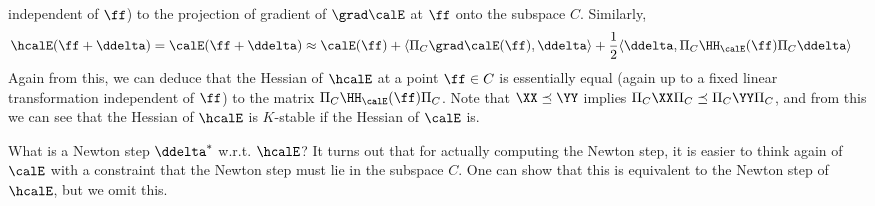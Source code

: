 independent of $\ff$) to the projection of gradient of $\grad\calE$ at $\ff$ onto the subspace $C$.
Similarly,
\begin{align*}
   \hcalE(\ff+\ddelta) = \calE(\ff+\ddelta) & \approx \calE(\ff) + \langle\Pi_C\grad\calE(\ff),\ddelta\rangle + \frac{1}{2}\langle\ddelta,\Pi_C\HH_{\calE}(\ff)\Pi_C\ddelta\rangle
\end{align*}
Again from this, we can deduce that the Hessian of $\hcalE$ at a point
$\ff\in C$ is essentially equal (again up to a fixed linear transformation
independent of $\ff$) to the
matrix $\Pi_C\HH_{\calE}(\ff)\Pi_C$.
Note that $\XX \preceq \YY$ implies  $\Pi_C \XX \Pi_C \preceq \Pi_C
\YY \Pi_C$, and from this we can see that the Hessian of  $\hcalE$ is
$K$-stable if the Hessian of $\calE$ is.

What is a Newton step $\ddelta^*$ w.r.t. $\hcalE$? It turns out that
for actually computing the Newton step, it is easier to think again of
$\calE$ with a constraint that the Newton step must lie in the
subspace $C$.
One can show that this is equivalent to the Newton step of $\hcalE$,
but we omit this.

